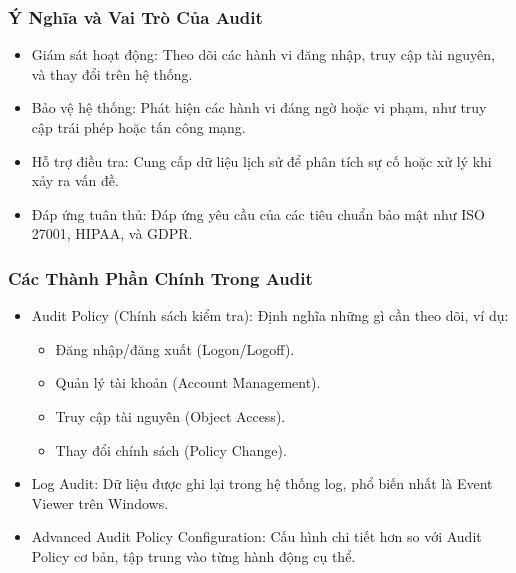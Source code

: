 \documentclass[13pt]{article}
\begin{document}
                \subsubsection{Ý Nghĩa và Vai Trò Của Audit}
                \begin{itemize}
                \item Giám sát hoạt động: Theo dõi các hành vi đăng nhập, truy cập tài nguyên, và thay đổi trên hệ thống.

                \item Bảo vệ hệ thống: Phát hiện các hành vi đáng ngờ hoặc vi phạm, như truy cập trái phép hoặc tấn công mạng.
                
                \item Hỗ trợ điều tra: Cung cấp dữ liệu lịch sử để phân tích sự cố hoặc xử lý khi xảy ra vấn đề.
                
                \item Đáp ứng tuân thủ: Đáp ứng yêu cầu của các tiêu chuẩn bảo mật như ISO 27001, HIPAA, và GDPR.
                
                \end{itemize}

                \subsubsection{Các Thành Phần Chính Trong Audit}
                \begin{itemize}
                \item Audit Policy (Chính sách kiểm tra): Định nghĩa những gì cần theo dõi, ví dụ:
                    \begin{itemize}
                        \item Đăng nhập/đăng xuất (Logon/Logoff).
                        \item Quản lý tài khoản (Account Management).
                        \item Truy cập tài nguyên (Object Access).
                        \item Thay đổi chính sách (Policy Change).
                    \end{itemize}

                \item Log Audit: Dữ liệu được ghi lại trong hệ thống log, phổ biến nhất là Event Viewer trên Windows.
                
                \item Advanced Audit Policy Configuration: Cấu hình chi tiết hơn so với Audit Policy cơ bản, tập trung vào từng hành động cụ thể.
            
                
                \end{itemize}
\end{document}
